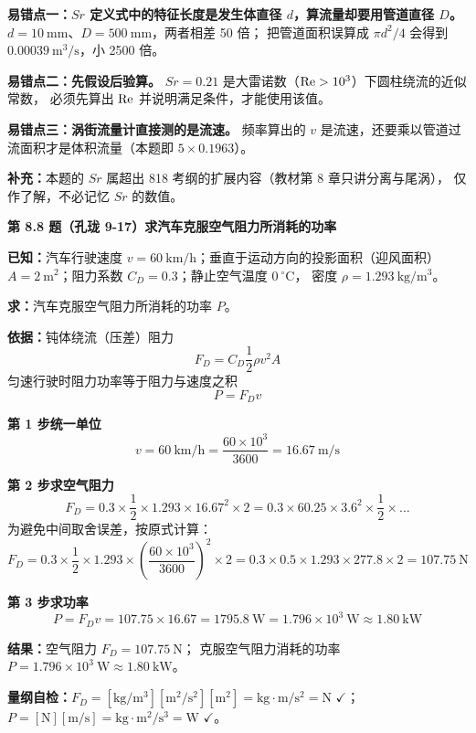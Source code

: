 \begin{yicuo}
\textbf{易错点一：$Sr$ 定义式中的特征长度是发生体直径 $d$，算流量却要用管道直径 $D$。}
$d=10\ \mathrm{mm}$、$D=500\ \mathrm{mm}$，两者相差 50 倍；
把管道面积误算成 $\pi d^{2}/4$ 会得到 $0.00039\ \mathrm{m^3/s}$，小 2500 倍。

\textbf{易错点二：先假设后验算。}
$Sr=0.21$ 是大雷诺数（$\mathrm{Re}>10^{3}$）下圆柱绕流的近似常数，
必须先算出 $\mathrm{Re}$ 并说明满足条件，才能使用该值。

\textbf{易错点三：涡街流量计直接测的是流速。}
频率算出的 $v$ 是流速，还要乘以管道过流面积才是体积流量（本题即 $5\times0.1963$）。

\textbf{补充：}本题的 $Sr$ 属超出 818 考纲的扩展内容（教材第 8 章只讲分离与尾涡），
仅作了解，不必记忆 $Sr$ 的数值。
\end{yicuo}

\noindent\textbf{第 8.8 题（孔珑 9-17）\quad 求汽车克服空气阻力所消耗的功率}

\begin{jie}
\textbf{已知：}汽车行驶速度 $v=60\ \mathrm{km/h}$；垂直于运动方向的投影面积（迎风面积）
$A=2\ \mathrm{m^2}$；阻力系数 $C_D=0.3$；静止空气温度 $0\ ^{\circ}\mathrm{C}$，
密度 $\rho=1.293\ \mathrm{kg/m^3}$。

\textbf{求：}汽车克服空气阻力所消耗的功率 $P$。

\textbf{依据：}钝体绕流（压差）阻力
\[ F_D=C_D\frac{1}{2}\rho v^{2}A \]
匀速行驶时阻力功率等于阻力与速度之积
\[ P=F_Dv \]

\textbf{第 1 步\quad 统一单位}
\[ v=60\ \mathrm{km/h}=\frac{60\times10^{3}}{3600}=16.67\ \mathrm{m/s} \]

\textbf{第 2 步\quad 求空气阻力}
\[ F_D=0.3\times\frac{1}{2}\times1.293\times16.67^{2}\times2
=0.3\times60.25\times3.6^{2}\times\frac{1}{2}\times\ldots \]
为避免中间取舍误差，按原式计算：
\[ F_D=0.3\times\frac{1}{2}\times1.293\times\left(\frac{60\times10^{3}}{3600}\right)^{2}\times2
=0.3\times0.5\times1.293\times277.8\times2=107.75\ \mathrm{N} \]

\textbf{第 3 步\quad 求功率}
\[ P=F_Dv=107.75\times16.67=1795.8\ \mathrm{W}=1.796\times10^{3}\ \mathrm{W}\approx1.80\ \mathrm{kW} \]

\textbf{结果：}空气阻力 $F_D=107.75\ \mathrm{N}$；
克服空气阻力消耗的功率 $P=1.796\times10^{3}\ \mathrm{W}\approx1.80\ \mathrm{kW}$。

\textbf{量纲自检：}$F_D=[\mathrm{kg/m^3}][\mathrm{m^2/s^2}][\mathrm{m^2}]
=\mathrm{kg\cdot m/s^2}=\mathrm{N}$ $\checkmark$；
$P=[\mathrm{N}][\mathrm{m/s}]=\mathrm{kg\cdot m^2/s^3}=\mathrm{W}$ $\checkmark$。
\end{jie}

